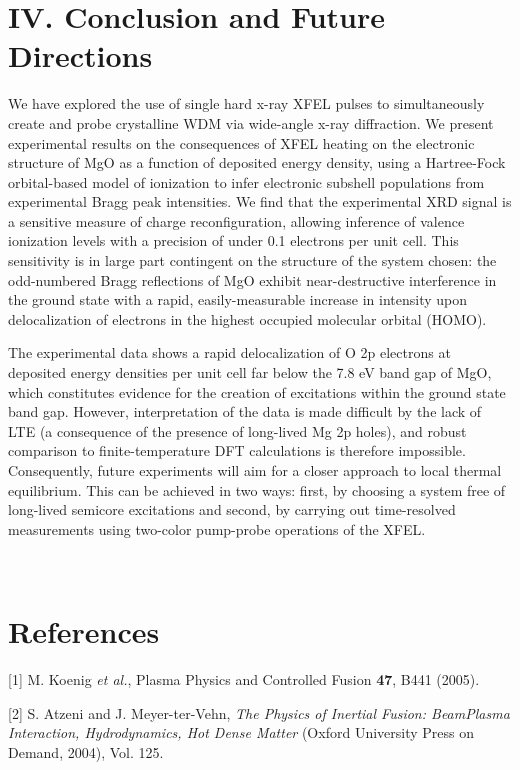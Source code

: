 \section{IV. Conclusion and Future Directions}

We have explored the use of single hard x-ray XFEL pulses to
simultaneously create and probe crystalline WDM via wide-angle x-ray
diffraction. We present experimental results on the consequences of XFEL
heating on the electronic structure of MgO as a function of deposited
energy density, using a Hartree-Fock orbital-based model of ionization
to infer electronic subshell populations from experimental Bragg peak
intensities. We find that the experimental XRD signal is a sensitive
measure of charge reconfiguration, allowing inference of valence
ionization levels with a precision of under 0.1 electrons per unit cell.
This sensitivity is in large part contingent on the structure of the
system chosen: the odd-numbered Bragg reflections of MgO exhibit
near-destructive interference in the ground state with a rapid,
easily-measurable increase in intensity upon delocalization of electrons
in the highest occupied molecular orbital (HOMO).

The experimental data shows a rapid delocalization of O 2p electrons at
deposited energy densities per unit cell far below the 7.8 eV band gap
of MgO, which constitutes evidence for the creation of excitations
within the ground state band gap. However, interpretation of the data is
made difficult by the lack of LTE (a consequence of the presence of
long-lived Mg 2p holes), and robust comparison to finite-temperature DFT
calculations is therefore impossible. Consequently, future experiments
will aim for a closer approach to local thermal equilibrium. This can be
achieved in two ways: first, by choosing a system free of long-lived
semicore excitations and second, by carrying out time-resolved
measurements using two-color pump-probe operations of the XFEL.

\emph{\\}

\section{References}

{[}1{]} M. Koenig \emph{et al.}, Plasma Physics and Controlled Fusion
\textbf{47}, B441 (2005).

{[}2{]} S. Atzeni and J. Meyer-ter-Vehn, \emph{The Physics of Inertial
Fusion: BeamPlasma Interaction, Hydrodynamics, Hot Dense Matter} (Oxford
University Press on Demand, 2004), Vol. 125.

